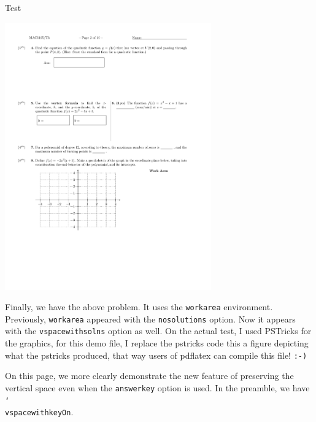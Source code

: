 \documentclass{article}
\newcommand{\cs}[1]{\texttt{\char`\\#1}}
\begin{document}
\begin{exam}{Test\nExam}
\begin{theseproblems}
\begin{problem}[12]
\begin{workarea}{\sameVspace}
\begin{minipage}[t]{3.5in}
\includegraphics[width=3.5in]{coorplane}
\end{minipage}\hfill
\begin{minipage}[t]{\linewidth-3.5in-30pt}\kern0pt
\end{minipage}
\end{workarea}
\end{problem}

\begin{eqComments}[Comments:]
Finally, we have the above problem. It uses the \texttt{workarea}
environment. Previously, \texttt{workarea} appeared with the \texttt{nosolutions}
option. Now it appears with the \texttt{vspacewithsolns} option as well.
On the actual test, I used \textsf{PSTricks} for the graphics, for this
demo file, I replace the \textsf{pstricks} code this a figure depicting what the
\textsf{pstricks} produced, that way users of pdflatex can compile this
file! \texttt{:-)}
\end{eqComments}

\newpage

\begin{eqComments}%
On this page, we more clearly demonstrate the new feature of preserving
the vertical space even when the \texttt{answerkey} option is used. In the
preamble, we have \cs{vspacewithkeyOn}.
\end{eqComments}


\resetSolnAfterToDefault


\end{theseproblems}
\end{exam}
\end{document}

